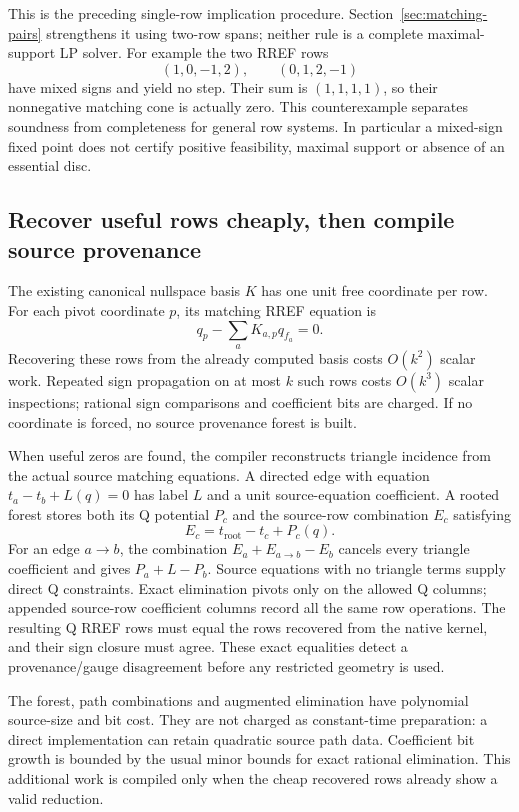 This is the preceding single-row implication procedure.
Section~\ref{sec:matching-pairs} strengthens it using two-row spans;
neither rule is a complete maximal-support
LP solver. For example the two RREF rows
\[
 (1,0,-1,2),\qquad(0,1,2,-1)
\]
have mixed signs and yield no step. Their sum is $(1,1,1,1)$, so their
nonnegative matching cone is actually zero. This counterexample separates
soundness from completeness for general row systems. In particular a
mixed-sign fixed point does not certify positive feasibility, maximal
support or absence of an essential disc.

\subsection{Recover useful rows cheaply, then compile source provenance}

The existing canonical nullspace basis $K$ has one unit free coordinate
per row. For each pivot coordinate $p$, its matching RREF equation is
\[
             q_p-\sum_a K_{a,p}q_{f_a}=0.
\]
Recovering these rows from the already computed basis costs $O(k^2)$ scalar
work. Repeated sign propagation on at most $k$ such rows costs $O(k^3)$
scalar inspections; rational sign comparisons and coefficient bits are
charged. If no coordinate is forced, no source provenance forest is built.

When useful zeros are found, the compiler reconstructs triangle incidence
from the actual source matching equations. A directed edge with equation
$t_a-t_b+L(q)=0$ has label $L$ and a unit source-equation coefficient.
A rooted forest stores both its Q potential $P_c$ and the source-row
combination $E_c$ satisfying
\[
                   E_c=t_{\mathrm{root}}-t_c+P_c(q).
\]
For an edge $a\to b$, the combination $E_a+E_{a\to b}-E_b$ cancels every
triangle coefficient and gives $P_a+L-P_b$. Source equations with no
triangle terms supply direct Q constraints. Exact elimination pivots only
on the allowed Q columns; appended source-row coefficient columns record
all the same row operations. The resulting Q RREF rows must equal the rows
recovered from the native kernel, and their sign closure must agree.
These exact equalities detect a provenance/gauge disagreement before any
restricted geometry is used.

The forest, path combinations and augmented elimination have polynomial
source-size and bit cost. They are not charged as constant-time preparation:
a direct implementation can retain quadratic source path data. Coefficient
bit growth is bounded by the usual minor bounds for exact rational
elimination. This additional work is compiled only when the cheap recovered
rows already show a valid reduction.

